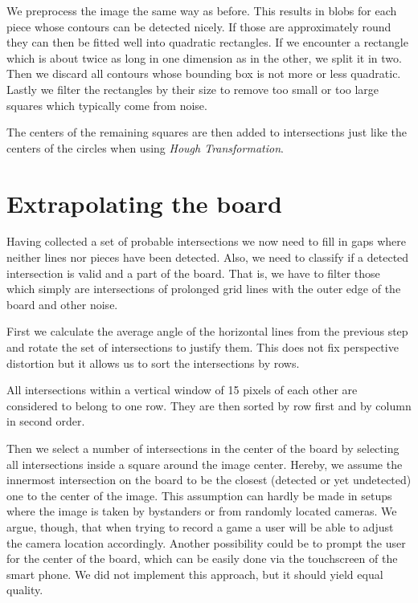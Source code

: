 	We preprocess the image the same way as before. This results in blobs for each piece whose contours can be detected nicely. If those are approximately round they can then be fitted well into quadratic rectangles. If we encounter a rectangle which is about twice as long in one dimension as in the other, we split it in two. Then we discard all contours whose bounding box is not more or less quadratic. Lastly we filter the rectangles by their size to remove too small or too large squares which typically come from noise.

	The centers of the remaining squares are then added to intersections just like the centers of the circles when using \emph{Hough Transformation}.

	\section{Extrapolating the board}
	\label{detector-calculate}
	Having collected a set of probable intersections we now need to fill in gaps where neither lines nor pieces have been detected. Also, we need to classify if a detected intersection is valid and a part of the board. That is, we have to filter those which simply are intersections of prolonged grid lines with the outer edge of the board and other noise.

	First we calculate the average angle of the horizontal lines from the previous step and rotate the set of intersections to justify them. This does not fix perspective distortion but it allows us to sort the intersections by rows.

	All intersections within a vertical window of 15 pixels of each other are considered to belong to one row. They are then sorted by row first and by column in second order.

	Then we select a number of intersections in the center of the board by selecting all intersections inside a square around the image center. Hereby, we assume the innermost intersection on the board to be the closest (detected or yet undetected) one to the center of the image. This assumption can hardly be made in setups where the image is taken by bystanders or from randomly located cameras. We argue, though, that when trying to record a game a user will be able to adjust the camera location accordingly. Another possibility could be to prompt the user for the center of the board, which can be easily done via the touchscreen of the smart phone. We did not implement this approach, but it should yield equal quality.

